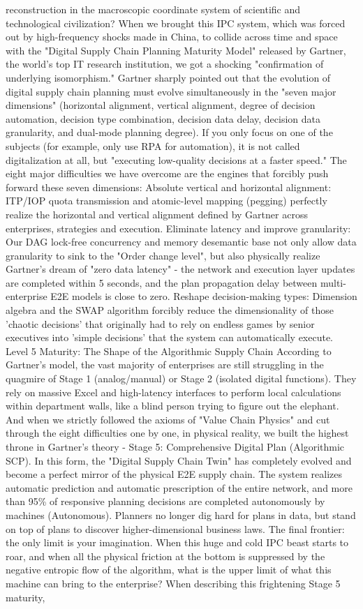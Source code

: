 \documentclass[11pt,a4paper]{article}
\begin{document}
reconstruction in the macroscopic coordinate system of scientific and technological civilization? When we brought this IPC system, which was forced out by high-frequency shocks made in China, to collide across time and space with the "Digital Supply Chain Planning Maturity Model" released by Gartner, the world's top IT research institution, we got a shocking "confirmation of underlying isomorphism." Gartner sharply pointed out that the evolution of digital supply chain planning must evolve simultaneously in the "seven major dimensions" (horizontal alignment, vertical alignment, degree of decision automation, decision type combination, decision data delay, decision data granularity, and dual-mode planning degree). If you only focus on one of the subjects (for example, only use RPA for automation), it is not called digitalization at all, but "executing low-quality decisions at a faster speed." The eight major difficulties we have overcome are the engines that forcibly push forward these seven dimensions: Absolute vertical and horizontal alignment: ITP/IOP quota transmission and atomic-level mapping (pegging) perfectly realize the horizontal and vertical alignment defined by Gartner across enterprises, strategies and execution. Eliminate latency and improve granularity: Our DAG lock-free concurrency and memory desemantic base not only allow data granularity to sink to the "Order change level", but also physically realize Gartner's dream of "zero data latency" - the network and execution layer updates are completed within 5 seconds, and the plan propagation delay between multi-enterprise E2E models is close to zero. Reshape decision-making types: Dimension algebra and the SWAP algorithm forcibly reduce the dimensionality of those 'chaotic decisions' that originally had to rely on endless games by senior executives into 'simple decisions' that the system can automatically execute. Level 5 Maturity: The Shape of the Algorithmic Supply Chain According to Gartner’s model, the vast majority of enterprises are still struggling in the quagmire of Stage 1 (analog/manual) or Stage 2 (isolated digital functions). They rely on massive Excel and high-latency interfaces to perform local calculations within department walls, like a blind person trying to figure out the elephant. And when we strictly followed the axioms of "Value Chain Physics" and cut through the eight difficulties one by one, in physical reality, we built the highest throne in Gartner's theory - Stage 5: Comprehensive Digital Plan (Algorithmic SCP). In this form, the "Digital Supply Chain Twin" has completely evolved and become a perfect mirror of the physical E2E supply chain. The system realizes automatic prediction and automatic prescription of the entire network, and more than 95\% of responsive planning decisions are completed autonomously by machines (Autonomous). Planners no longer dig hard for plans in data, but stand on top of plans to discover higher-dimensional business laws. The final frontier: the only limit is your imagination. When this huge and cold IPC beast starts to roar, and when all the physical friction at the bottom is suppressed by the negative entropic flow of the algorithm, what is the upper limit of what this machine can bring to the enterprise? When describing this frightening Stage 5 maturity, 
\end{document}
